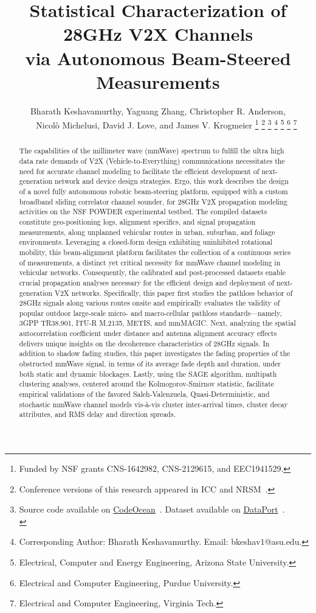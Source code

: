 \documentclass[10pt, twocolumn]{IEEEtran}
\title{Statistical Characterization of 28GHz V2X Channels\\ via Autonomous Beam-Steered Measurements}
\author{Bharath Keshavamurthy\IEEEauthorrefmark{1}, Yaguang Zhang\IEEEauthorrefmark{2}, Christopher R. Anderson\IEEEauthorrefmark{3},\\\ \ \ \ Nicol\`{o} Michelusi\IEEEauthorrefmark{1}, David J. Love\IEEEauthorrefmark{2}, and James V. Krogmeier\IEEEauthorrefmark{2}
\thanks{Funded by NSF grants CNS-1642982, CNS-2129615, and EEC1941529.}
\thanks{Conference versions of this research appeared in ICC and NRSM~\cite{SPAVE_ICC, SPAVE_NRSM}.}
\thanks{Source code available on \href{https://codeocean.com/capsule/9545863/tree}{CodeOcean}~\cite{CodeOcean}. Dataset available on \href{http://ieee-dataport.org/12580}{DataPort}~\cite{DataPort}.\\}
\thanks{Corresponding Author: Bharath Keshavamurthy. Email: bkeshav$1$@asu.edu.}
\thanks{\IEEEauthorrefmark{1}Electrical, Computer and Energy Engineering, Arizona State University.}
\thanks{\IEEEauthorrefmark{2}Electrical and Computer Engineering, Purdue University.}
\thanks{\IEEEauthorrefmark{3}Electrical and Computer Engineering, Virginia Tech.}
\vspace{-10mm}
}
\begin{document}

\maketitle
\thispagestyle{empty}
\pagestyle{empty}
\vspace{-10mm}

\begin{abstract}
The capabilities of the millimeter wave (mmWave) spectrum to fulfill the ultra high data rate demands of V2X (Vehicle-to-Everything) communications necessitates the need for accurate channel modeling to facilitate the efficient development of next-generation network and device design strategies. Ergo, this work describes the design of a novel fully autonomous robotic beam-steering platform, equipped with a custom broadband sliding correlator channel sounder, for 28GHz V2X propagation modeling activities on the NSF POWDER experimental testbed. The compiled datasets constitute geo-positioning logs, alignment specifics, and signal propagation measurements, along unplanned vehicular routes in urban, suburban, and foliage environments. Leveraging a closed-form design exhibiting uninhibited rotational mobility, this beam-alignment platform facilitates the collection of a continuous series of measurements, a distinct yet critical necessity for mmWave channel modeling in vehicular networks. Consequently, the calibrated and post-processed datasets enable crucial propagation analyses necessary for the efficient design and deployment of next-generation V2X networks. Specifically, this paper first studies the pathloss behavior of 28GHz signals along various routes onsite and empirically evaluates the validity of popular outdoor large-scale micro- and macro-cellular pathloss standards---namely, 3GPP TR38.901, ITU-R M.2135, METIS, and mmMAGIC. Next, analyzing the spatial autocorrelation coefficient under distance and antenna alignment accuracy effects delivers unique insights on the decoherence characteristics of 28GHz signals. In addition to shadow fading studies, this paper investigates the fading properties of the obstructed mmWave signal, in terms of its average fade depth and duration, under both static and dynamic blockages. Lastly, using the SAGE algorithm, multipath clustering analyses, centered around the Kolmogorov-Smirnov statistic, facilitate empirical validations of the favored Saleh-Valenzuela, Quasi-Deterministic, and stochastic mmWave channel models vis-\`{a}-vis cluster inter-arrival times, cluster decay attributes, and RMS delay and direction spreads.
\end{abstract}
\vspace{-1mm}
\end{document}
